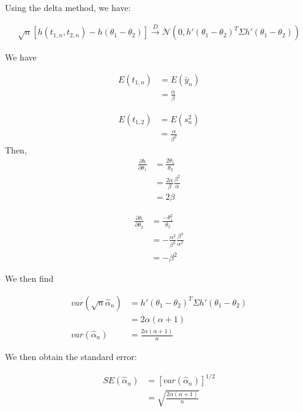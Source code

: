 \documentclass[11pt]{article}
\begin{document}
Using the delta method, we have:

\begin{align*}
    \sqrt{n}[h(t_{1, n}, t_{2, n}) - h(\theta_1 - \theta_2)] \xrightarrow[]{D} \mathcal{N}(0, h'(\theta_1 - \theta_2)^T\Sigma h'(\theta_1 - \theta_2))
\end{align*}

We have 

\begin{align*}
    E(t_{1,n}) &= E(\bar{y}_n)\\
    &= \frac{\alpha}{\beta}
\end{align*}

\begin{align*}
    E(t_{1,2}) &= E(s^2_n)\\
    &= \frac{\alpha}{\beta^2}
\end{align*}
Then, 
\begin{align*}
    \frac{\partial h}{\partial \theta_1} &= \frac{2\theta_1}{\theta_2}\\
    &= \frac{2\alpha}{\beta} \frac{\beta^2}{\alpha}\\
    &= 2\beta
\end{align*}

\begin{align*}
    \frac{\partial h}{\partial \theta_2} &= \frac{-\theta_1^2}{\theta_2}\\
    &= -\frac{\alpha^2}{\beta^2} \frac{\beta^4}{\alpha^2}\\
    &= -\beta^2
\end{align*}

We then find

\begin{align*}
    var(\sqrt{n}\hat{\alpha}_n) &= h'(\theta_1 - \theta_2)^T\Sigma h'(\theta_1 - \theta_2)\\
    &= 2\alpha(\alpha+1)\\
     var(\hat{\alpha}_n) &= \frac{2\alpha(\alpha+1)}{n}
\end{align*}

We then obtain the standard error:


\begin{align*}
    SE(\hat{\alpha}_n) &=  [var(\hat{\alpha}_n)]^{1/2}\\
    &= \sqrt{\frac{2\alpha(\alpha+1)}{n}}
\end{align*}




 
\end{document}
